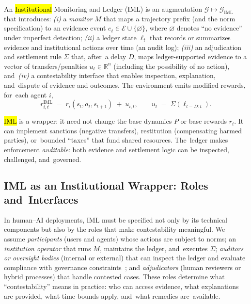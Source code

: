 \documentclass[mca,article,accept,pdftex,oneauthor]{Definitions/mdpi}
\begin{document}
\begin{Definition}
An {\hl{Institutional} %
 Monitoring and Ledger (IML)} is an augmentation $\mathcal{G}\mapsto \mathcal{G}_{\text{IML}}$ that introduces: \textit{(i)} a \emph{monitor} $M$ that maps a trajectory prefix (and the norm specification) to an evidence event $e_t\in\mathcal{E}\cup\{\varnothing\}$, where $\varnothing$ denotes ``no evidence'' under imperfect detection; \textit{(ii)} a {ledger state} $\ell_t$ that records or summarizes evidence and institutional actions over time (an audit log); \textit{(iii)} an {adjudication and settlement rule} $\Sigma$ that, after~a delay $D$, maps ledger-supported evidence to a vector of transfers/penalties $u_t\in\mathbb{R}^n$ (including the possibility of no action), and~\textit{(iv)} a {contestability interface} that enables inspection, explanation, and~dispute of evidence and outcomes.
The environment emits modified rewards, for~each agent $i$,
\[
  r_{i,t}^{\text{IML}}
  \;=\;
  r_i(s_t,a_t,s_{t+1})
  \;+\;
  u_{i,t},
  \qquad
  u_t \;=\; \Sigma\!\left(\ell_{t-D:t}\right).
\]
\end{Definition}

\hl{IML} %
 is a wrapper: it need not change the base dynamics $P$ or base rewards $r_i$. It can implement sanctions (negative transfers), restitution (compensating harmed parties), or~bounded ``taxes'' that fund shared resources. The~ledger makes enforcement \emph{auditable}: both evidence and settlement logic can be inspected, challenged, and~governed.

\subsection{IML as an Institutional Wrapper: Roles and~Interfaces}
\label{sec:roles}

In human--AI deployments, IML must be specified not only by its technical components but also by the roles that make contestability meaningful. We assume \emph{participants} (users and agents) whose actions are subject to norms; an \emph{institution operator} that runs $M$, maintains the ledger, and~executes $\Sigma$; \emph{auditors or oversight bodies} (internal or external) that can inspect the ledger and evaluate compliance with governance \mbox{constraints \citep{Raji2020Auditing,Sandvig2014AuditingAlgorithms};} and \emph{adjudicators} (human reviewers or hybrid processes) that handle contested cases. These roles determine what ``contestability'' means in practice: who can access evidence, what explanations are provided, what time bounds apply, and~what remedies are~available.
\end{document}
